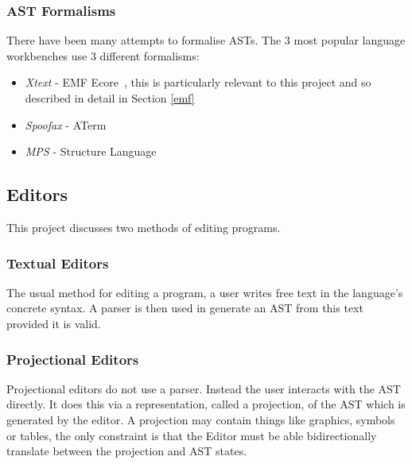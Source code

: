 \documentclass{article}
\begin{document}
\subsubsection{AST Formalisms}\label{astFormalisms}
There have been many attempts to formalise ASTs. The 3 most popular language workbenches use 3 different formalisms: \begin{itemize}
\item \emph{Xtext} - EMF Ecore~\cite{emf}, this is particularly relevant to this project and so described in detail in Section \ref{emf}
\item \emph{Spoofax} - ATerm~\cite{aterm} 
\item \emph{MPS} - Structure Language~\cite{mpsStructureLanguage} 
\end{itemize}
%
\subsection{Editors}
This project discusses two methods of editing programs.
\subsubsection{Textual Editors}
The usual method for editing a program, a user writes free text in the language's concrete syntax. A parser is then used in generate an AST from this text provided it is valid.
\subsubsection{Projectional Editors}
Projectional editors do not use a parser. Instead the user interacts with the AST directly. It does this via a representation, called a projection, of the AST which is generated by the editor. A projection may contain things like graphics, symbols or tables, the only constraint is that the Editor must be able bidirectionally translate between the projection and AST states. 

\end{document}
